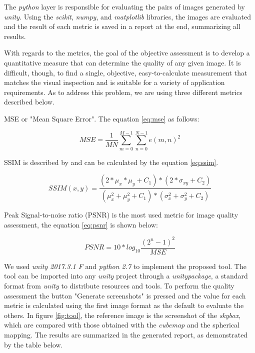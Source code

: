 \documentclass[12pt]{article}
\begin{document}
The \textit{python} layer is responsible for evaluating the pairs of images generated by \textit{unity}. Using the \textit{scikit}, \textit{numpy}, and \textit{matplotlib} libraries, the images are evaluated and the result of each metric is saved in a report at the end, summarizing all results. 

With regards to the metrics, the goal of the objective assessment is to develop a quantitative measure that can determine the quality of any given image. It is difficult, though, to find a single, objective, easy-to-calculate measurement that matches the visual inspection and is suitable for a variety of application requirements. As to address this problem, we are using three different metrics described below.

MSE or "Mean Square Error". The equation \ref{eq:mse} as follows:

\begin{equation}
MSE=\frac{1}{MN}\sum_{m=0}^{M-1}{\sum_{n=0}^{N-1}{e(m,n)^2}}
\label{eq:mse}
\end{equation}

SSIM is described by \cite{wang2004image} and can be calculated by the equation \ref{eq:ssim}.

\begin{equation}
SSIM(x,y)=\frac{(2*\mu_x*\mu_y+C_1)*(2*\sigma_{xy}+C_2)}{(\mu^2_x+\mu^2_y+C_1)*(\sigma^2_x+\sigma^2_y+C_2)}
\label{eq:ssim}
\end{equation}

Peak Signal-to-noise ratio (PSNR) is the most used metric for image quality assessment, the equation \ref{eq:psnr} is shown below:

\begin{equation}
PSNR = 10*log_{10}{\frac{(2^n-1)^2}{MSE}}
\label{eq:psnr}
\end{equation}

We used \textit{unity 2017.3.1 F} and \textit{python 2.7} to implement the proposed tool. The tool can be imported into any \textit{unity} project through a \textit{unitypackage}, a standard format from \textit{unity} to distribute resources and tools. To perform the quality assessment the button "Generate screenshots" is pressed and the value for each metric is calculated using the first image format as the default to evaluate the others. In figure \ref{fig:tool}, the reference image is the screenshot of the \textit{skybox}, which are compared with those obtained with the \textit{cubemap} and the spherical mapping. The results are summarized in the generated report, as demonstrated by the table below.
\end{document}
